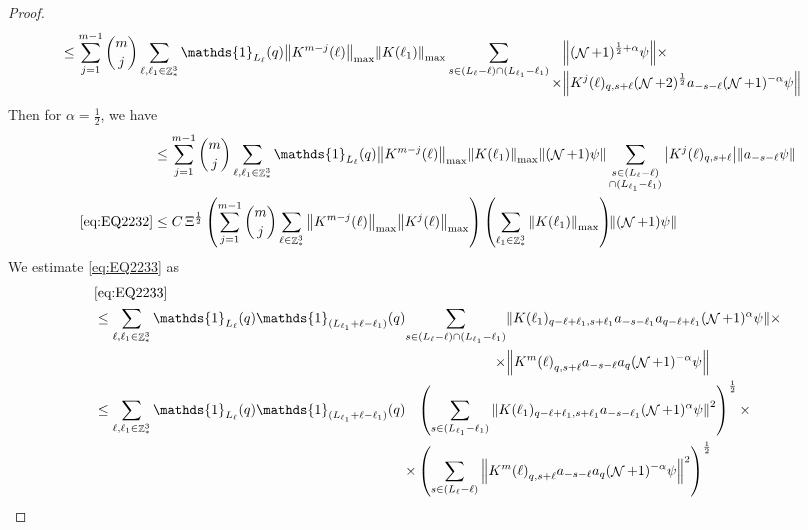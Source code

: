 \documentclass[sn-mathphys, Numbered ,a4paper]{sn-jnl}%
\DeclareMathOperator{\Z}{\mathbb{Z}}
\DeclareMathOperator{\NN}{\mathcal{N}}
\newcommand{\half}{\frac{1}{2}}
\theoremstyle{plain}
\theoremstyle{definition}
\theoremstyle{remark}
\theoremstyle{plain}
\theoremstyle{definition}
\theoremstyle{remark}
\begin{document}
{\begin{proof}
\begin{align}
		&\leq \sum\limits_{j=1}^{m-1} {{m}\choose j} \sum\limits_{\ell, \ell_1\in \Z^3_*} \mathds{1}_{L_{\ell}}(q) \norm{K^{m-j}(\ell)}_{\mathrm{max}} \norm{ K(\ell_1)}_{\mathrm{max}} \sum\limits_{s\in(L_{\ell}-\ell) \cap (L_{\ell_1}-\ell_1)} \begin{aligned}[t] &\norm{ (\NN+1)^{\half+\alpha}\psi}\nonumber \times \\ \times&\norm{  K^{j}(\ell)_{q,s+\ell} (\NN+2)^\half a_{-s-\ell} (\NN+1)^{-\alpha} \psi }\end{aligned} \nonumber
	\end{align} 
	Then for $\alpha = \half$, we have
	\begin{align}
		&\leq \sum\limits_{j=1}^{m-1} {{m}\choose j} \sum\limits_{\ell, \ell_1\in \Z^3_*} \mathds{1}_{L_{\ell}}(q) \norm{K^{m-j}(\ell)}_{\mathrm{max}} \norm{ K(\ell_1)}_{\mathrm{max}} \norm{(\NN+1)\psi}\sum\limits_{ \substack{s \in (L_{\ell}-\ell) \\ \cap (L_{\ell_1}-\ell_1)}} \abs{K^{j}(\ell)_{q,s+\ell}} \norm{ a_{-s-\ell}  \psi }\nonumber\\
		\eqref{eq:EQ2232} &\leq  C \, \Xi^\half \left(  \sum\limits_{j=1}^{m-1} {{m}\choose j} \sum\limits_{\ell \in \Z^3_*} \norm{K^{m-j}(\ell)}_{\mathrm{max}} \norm{ K^{j}(\ell)}_{\mathrm{max}}\right) \left( \sum\limits_{ \ell_1\in \Z^3_*}\norm{ K(\ell_1) }_{\mathrm{max}} \right)\!\! \norm{(\NN+1) \psi }\label{eq:estEQ2232}
	\end{align}
	We estimate \eqref{eq:EQ2233} as
	\begin{align}
		&\eqref{eq:EQ2233}\nonumber\\
		&\leq \sum\limits_{\ell, \ell_1\in \Z^3_*} \mathds{1}_{L_{\ell}}(q) \mathds{1}_{(L_{\ell_1}+\ell-\ell_1)}(q) \begin{aligned}[t]\sum\limits_{ s \in (L_{\ell}-\ell) \cap (L_{\ell_1}-\ell_1)}  &\norm{K(\ell_1)_{q-\ell+\ell_1,s+\ell_1} a_{-s-\ell_1} a_{q-\ell+\ell_1}  (\NN+1)^{\alpha}\psi} \times\nonumber\\\times &\norm{ K^m{(\ell)}_{q,s+\ell}  a_{-s-\ell} a_{q} (\NN+1)^{-\alpha} \psi } \end{aligned}\nonumber\\
		&\leq \sum\limits_{\ell, \ell_1\in \Z^3_*} \mathds{1}_{L_{\ell}}(q) \mathds{1}_{(L_{\ell_1}+\ell-\ell_1)}(q) \begin{aligned}[t]&\left(\sum\limits_{ s \in  (L_{\ell_1}-\ell_1)} \norm{K(\ell_1)_{q-\ell+\ell_1,s+\ell_1} a_{-s-\ell_1} (\NN+1)^{\alpha}\psi}^2\right)^\half \times \nonumber\\ \times &\left( \sum\limits_{ s \in (L_{\ell}-\ell) } \norm{ K^m{(\ell)}_{q,s+\ell}  a_{-s-\ell} a_{q} (\NN+1)^{-\alpha} \psi }^2\right)^\half \end{aligned}\nonumber\\

\end{align}
\end{proof}}
\end{document}
